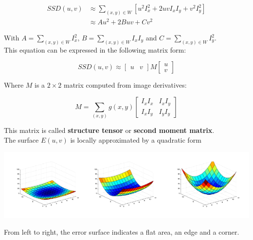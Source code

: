 \documentclass{article}
\begin{document}
\newpage

\begin{equation*}
    \begin{split}
        SSD(u, v) & \approx \sum_{(x,y) \in W} [u^2I_x^2+2uvI_xI_y+v^2I_y^2] \\
        & \approx Au^2 + 2Buv + Cv^2
    \end{split}
\end{equation*}

With $A = \sum_{(x,y) \in W}I_x^2$, $B = \sum_{(x,y) \in W}I_xI_y$ and $C = \sum_{(x,y) \in W}I_y^2$. \\

This equation can be expressed in the following matrix form:

\begin{equation*}
SSD(u,v) \approx \begin{bmatrix} u & v \end{bmatrix} M 
\begin{bmatrix} u \\ v \end{bmatrix} 
\end{equation*}

Where $M$ is a $2 \times 2$ matrix computed from image derivatives:

\begin{equation*}
    M = \sum_{(x,y)}g(x,y)\begin{bmatrix} I_xI_x & I_xI_y \\ I_xI_y & I_yI_y\end{bmatrix}
\end{equation*}

This matrix is called \textbf{structure tensor} or \textbf{second moment matrix}. \\

The surface $E(u,v)$ is locally approximated by a quadratic form

\begin{center}
    \includegraphics[width=.95\linewidth]{images/quadratic.png}    
\end{center}

From left to right, the error surface indicates a flat area, an edge and a corner. \\
\end{document}
